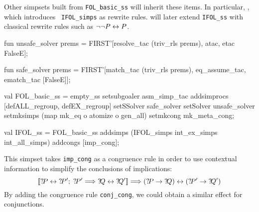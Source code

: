 Other simpsets built from \texttt{FOL_basic_ss} will inherit these items.
In particular, , which introduces {\tt
  IFOL_simps} as rewrite rules.   will later
extend \texttt{IFOL_ss} with classical rewrite rules such as $\neg\neg
P\leftrightarrow P$.
\begin{ttbox}
fun unsafe_solver prems = FIRST'[resolve_tac (triv_rls {\at} prems),
                                 atac, etac FalseE];

fun safe_solver prems = FIRST'[match_tac (triv_rls {\at} prems),
                               eq_assume_tac, ematch_tac [FalseE]];

val FOL_basic_ss =
      empty_ss setsubgoaler asm_simp_tac
               addsimprocs [defALL_regroup, defEX_regroup]
               setSSolver   safe_solver
               setSolver  unsafe_solver
               setmksimps (map mk_eq o atomize o gen_all)
               setmkcong mk_meta_cong;

val IFOL_ss = 
      FOL_basic_ss addsimps (IFOL_simps {\at} 
                             int_ex_simps {\at} int_all_simps)
                   addcongs [imp_cong];
\end{ttbox}
This simpset takes \texttt{imp_cong} as a congruence rule in order to use
contextual information to simplify the conclusions of implications:
\[ \List{\Var{P}\bimp\Var{P'};\; \Var{P'} \Imp \Var{Q}\bimp\Var{Q'}} \Imp
   (\Var{P}\imp\Var{Q}) \bimp (\Var{P'}\imp\Var{Q'})
\]
By adding the congruence rule \texttt{conj_cong}, we could obtain a similar
effect for conjunctions.




